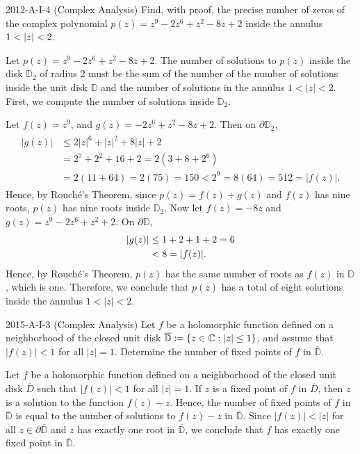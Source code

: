 \documentclass{article}
\begin{document}
\begin{prb}{2012-A-I-4 (Complex Analysis)}
	Find, with proof, the precise number of zeros of the complex polynomial $p(z) = z^{9} - 2z^{6} + z^{2} - 8z + 2$ inside the annulus $1 < \abs{z} < 2$. 
\end{prb}
\begin{solutions}
	Let $p(z) = z^{9} - 2z^{6} + z^{2} - 8z + 2$. The number of solutions to $p(z)$ inside the disk $\mathbb{D}_{2}$ of radius 2 must be the sum of the number of the number of solutions inside the unit disk $\mathbb{D}$ and the number of solutions in the annulus $1 < |z| < 2$. First, we compute the number of solutions inside $\mathbb{D}_{2}$. 
	
	Let $f(z) = z^{9}$, and $g(z) = -2z^{6} + z^{2} - 8z + 2$. Then on $\partial \mathbb{D}_{2}$, 
		\begin{align}
			\begin{split}
				|g(z)| &\leq 2|z|^{6} + |z|^{2} + 8|z| + 2 \\
				&= 2^{7} + 2^{2} + 16 + 2 = 2(3 + 8 + 2^{6}) \\
				&= 2(11 + 64) = 2(75) = 150 < 2^{9} = 8(64) = 512 = |f(z)|. 
			\end{split}
		\end{align}
	Hence, by Rouch{\'e}'s Theorem, since $p(z) = f(z) + g(z)$ and $f(z)$ has nine roots, $p(z)$ has nine roots inside $\mathbb{D}_{2}$. Now let $f(z) = -8z$ and $g(z) = z^{9} - 2z^{6} + z^{2} + 2$. On $\partial \mathbb{D}$, 
		\begin{align}
			\begin{split}
				\abs{g(z)} &\leq 1 + 2 + 1 + 2 = 6 \\
				&< 8 = |f(z)|. 
			\end{split}
		\end{align}
	Hence, by Rouch{\'e}'s Theorem, $p(z)$ has the same number of roots as $f(z)$ in $\mathbb{D}$, which is one. Therefore, we conclude that $p(z)$ has a total of eight solutions inside the annulus $1 < |z| < 2$. 
\end{solutions}
\begin{prb}{2015-A-I-3 (Complex Analysis)}
	Let $f$ be a holomorphic function defined on a neighborhood of the closed unit disk $\overline{\mathbb{D}} \coloneqq \brac*{z \in \mathbb{C}: |z| \leq 1}$, and assume that $|f(z)| < 1$ for all $|z| = 1$. Determine the number of fixed points of $f$ in $\overline{\mathbb{D}}$. 
\end{prb}
\begin{solutions}
	Let $f$ be a holomorphic function defined on a neighborhood of the closed unit disk $\overline{D}$ such that $|f(z)| < 1$ for all $|z| = 1$. If $z$ is a fixed point of $f$ in $\overline{D}$, then $z$ is a solution to the function $f(z) - z$. Hence, the number of fixed points of $f$ in $\overline{\mathbb{D}}$ is equal to the number of solutions to $f(z) - z$ in $\overline{\mathbb{D}}$. Since $|f(z)| < |z|$ for all $z \in \partial\overline{\mathbb{D}}$ and $z$ has exactly one root in $\overline{\mathbb{D}}$, we conclude that $f$ has exactly one fixed point in $\overline{\mathbb{D}}$.
\end{solutions}
\end{document}
